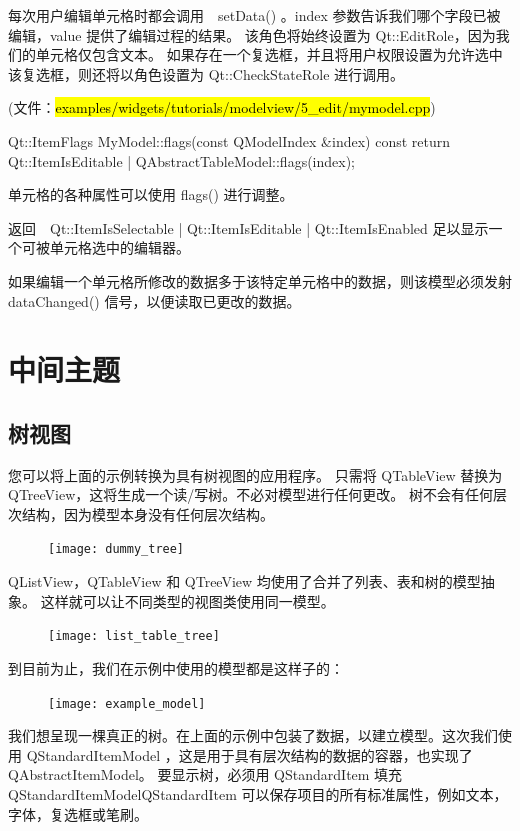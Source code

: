 每次用户编辑单元格时都会调用　setData() 。index 参数告诉我们哪个字段已被编辑，value 提供了编辑过程的结果。
该角色将始终设置为 Qt::EditRole，因为我们的单元格仅包含文本。
如果存在一个复选框，并且将用户权限设置为允许选中该复选框，则还将以角色设置为 Qt::CheckStateRole 进行调用。

(文件：\hl{examples/widgets/tutorials/modelview/5\_edit/mymodel.cpp})

\begin{cppcode}
Qt::ItemFlags MyModel::flags(const QModelIndex &index) const
{
    return Qt::ItemIsEditable | QAbstractTableModel::flags(index);
}
\end{cppcode}

单元格的各种属性可以使用 flags() 进行调整。

返回　Qt::ItemIsSelectable | Qt::ItemIsEditable | Qt::ItemIsEnabled 足以显示一个可被单元格选中的编辑器。

如果编辑一个单元格所修改的数据多于该特定单元格中的数据，则该模型必须发射　dataChanged() 信号，以便读取已更改的数据。

\section{中间主题}

\subsection{树视图}

您可以将上面的示例转换为具有树视图的应用程序。
只需将 QTableView 替换为 QTreeView，这将生成一个读/写树。不必对模型进行任何更改。
树不会有任何层次结构，因为模型本身没有任何层次结构。

\begin{figure}[hbt!]  
\texttt{[image: dummy\_tree]}
\end{figure}


QListView，QTableView 和 QTreeView 均使用了合并了列表、表和树的模型抽象。
这样就可以让不同类型的视图类使用同一模型。

\begin{figure}[hbt!]  
\texttt{[image: list\_table\_tree]}
\end{figure}

到目前为止，我们在示例中使用的模型都是这样子的：

\begin{figure}[hbt!]  
\texttt{[image: example\_model]}
\end{figure}

我们想呈现一棵真正的树。在上面的示例中包装了数据，以建立模型。这次我们使用 QStandardItemModel ，这是用于具有层次结构的数据的容器，也实现了 QAbstractItemModel。
要显示树，必须用 QStandardItem 填充 QStandardItemModelQStandardItem 可以保存项目的所有标准属性，例如文本，字体，复选框或笔刷。

